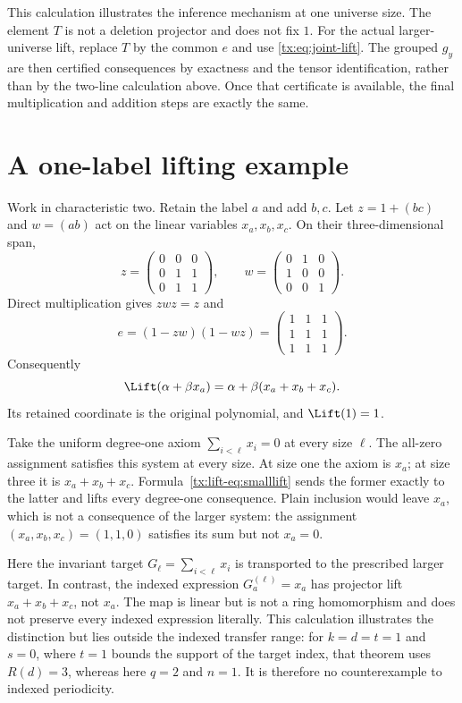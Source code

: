 \documentclass[11pt,a4paper,oneside,openany]{book}
\theoremstyle{definition}\newtheorem{definition}[theorem]{Definition}
\theoremstyle{remark}\newtheorem{remark}[theorem]{Remark}
\numberwithin{equation}{chapter}
\begin{document}
This calculation illustrates the inference mechanism at one universe size.
The element $T$ is not a deletion projector and does not fix $1$.
For the actual larger-universe lift, replace $T$ by the common $e$
and use \eqref{tx:eq:joint-lift}. The grouped $g_y$ are then certified
consequences by exactness and the tensor identification, rather than
by the two-line calculation above. Once that certificate is available,
the final multiplication and addition steps are exactly the same.


\section{A one-label lifting example}\label{tx:lift-sec:small}
Work in characteristic two. Retain the label $a$ and add $b,c$.
Let $z=1+(bc)$ and $w=(ab)$ act on the linear variables
$x_a,x_b,x_c$. On their three-dimensional span,
\[
 z=\begin{pmatrix}0&0&0\\0&1&1\\0&1&1\end{pmatrix},\qquad
 w=\begin{pmatrix}0&1&0\\1&0&0\\0&0&1\end{pmatrix}.
\]
Direct multiplication gives $zwz=z$ and
\[
                       e=(1-zw)(1-wz)
                         =\begin{pmatrix}1&1&1\\1&1&1\\1&1&1\end{pmatrix}.
\]
Consequently
\begin{equation}\label{tx:lift-eq:smalllift}
                  \Lift(\alpha+\beta x_a)
                      =\alpha+\beta(x_a+x_b+x_c).
\end{equation}
Its retained coordinate is the original polynomial, and $\Lift(1)=1$.

Take the uniform degree-one axiom $\sum_{i<\ell}x_i=0$ at every size $\ell$.
The all-zero assignment satisfies this system at every size.
At size one the axiom is $x_a$; at size three it is $x_a+x_b+x_c$.
Formula~\eqref{tx:lift-eq:smalllift} sends the former exactly to the latter and
lifts every degree-one consequence. Plain inclusion would leave $x_a$,
which is not a consequence of the larger system: the assignment
$(x_a,x_b,x_c)=(1,1,0)$ satisfies its sum but not $x_a=0$.

Here the invariant target $G_\ell=\sum_{i<\ell}x_i$ is transported to
the prescribed larger target. In contrast, the indexed expression
$G_a^{(\ell)}=x_a$ has projector lift $x_a+x_b+x_c$, not $x_a$. The map
is linear but is not a ring homomorphism and does not preserve every
indexed expression literally. This calculation illustrates the distinction but lies outside the
indexed transfer range: for $k=d=t=1$ and $s=0$, where $t=1$ bounds
the support of the target index, that theorem uses
$R(d)=3$, whereas here $q=2$ and $n=1$. It is therefore no
counterexample to indexed periodicity.
\end{document}
